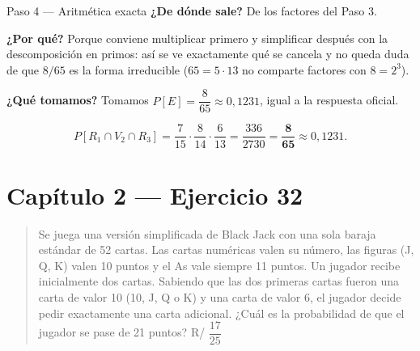 \documentclass[11pt]{article}
\begin{document}
\begin{sol}
\begin{paso}{Paso 4 --- Aritm\'etica exacta}
\textbf{¿De d\'onde sale?} De los factores del Paso 3.

\textbf{¿Por qu\'e?} Porque conviene multiplicar primero y simplificar despu\'es con la descomposici\'on en primos: as\'i se ve exactamente qu\'e se cancela y no queda duda de que $8/65$ es la forma irreducible ($65=5\cdot 13$ no comparte factores con $8=2^{3}$).

\textbf{¿Qu\'e tomamos?} Tomamos $P[E]=\dfrac{8}{65}\approx 0{,}1231$, igual a la respuesta oficial.
\end{paso}

\end{sol}

\begin{resp}
\[
P[R_1\cap V_2\cap R_3]=\frac{7}{15}\cdot\frac{8}{14}\cdot\frac{6}{13}=\frac{336}{2730}=\mathbf{\frac{8}{65}}\approx 0{,}1231 .
\]
\end{resp}

\section*{Cap\'itulo 2 --- Ejercicio 32}

\begin{quote}
Se juega una versi\'on simplificada de Black Jack con una sola baraja est\'andar de 52 cartas. Las cartas num\'ericas valen su n\'umero, las figuras (J, Q, K) valen 10 puntos y el As vale siempre 11 puntos. Un jugador recibe inicialmente dos cartas. Sabiendo que las dos primeras cartas fueron una carta de valor 10 (10, J, Q o K) y una carta de valor 6, el jugador decide pedir exactamente una carta adicional. ¿Cu\'al es la probabilidad de que el jugador se pase de 21 puntos? \hfill R/ $\dfrac{17}{25}$
\end{quote}
\end{document}
